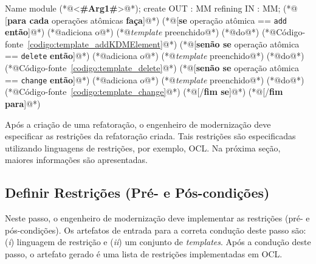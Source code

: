 \begin{codigo}[caption={[\textit{Template} ATL para agrupar as operações atômicas.] \textit{Template} ATL para agrupar as operações atômicas.},escapeinside={(*@}{@*)}, basicstyle=\footnotesize, label={codigo:template_module_agrupar}, language=ATL]{Name}
module (*@<\textbf{\#Arg1\#}>@*);
create OUT : MM refining IN : MM;
(*@ 
[\textbf{para cada} operações atômicas \textbf{faça}]@*)
    (*@[\textbf{se} operação atômica == \texttt{add} \textbf{então}]@*)
        (*@adiciona o@*) (*@\textit{template} preenchido@*) (*@do@*) (*@Código-fonte~\ref{codigo:template_addKDMElement}@*)
    (*@[\textbf{senão se} operação atômica == \texttt{delete} \textbf{então}]@*)
        (*@adiciona o@*) (*@\textit{template} preenchido@*) (*@do@*) (*@Código-fonte~\ref{codigo:template_delete}@*)
    (*@[\textbf{senão se} operação atômica == \texttt{change} \textbf{então}]@*)
        (*@adiciona o@*) (*@\textit{template} preenchido@*) (*@do@*) (*@Código-fonte~\ref{codigo:template_change}@*)
    (*@[/\textbf{fim se}]@*)
(*@[/\textbf{fim para}]@*)

\end{codigo}

Após a criação de uma refatoração, o engenheiro de modernização deve especificar as restrições da refatoração criada. Tais restrições são especificadas utilizando linguagens de restrições, por exemplo, OCL. Na próxima seção, maiores informações são apresentadas.

\subsection{Definir Restrições (Pré- e Pós-condições)}\label{sec:linguagem_de_restricao}

Neste passo, o engenheiro de modernização deve implementar as restrições (pré- e pós-condições). Os artefatos de entrada para a correta condução deste passo são: (\textit{i}) linguagem de restrição e (\textit{ii}) um conjunto de \textit{templates}. Após a condução deste passo, o artefato gerado é uma lista de restrições implementadas em OCL. 

